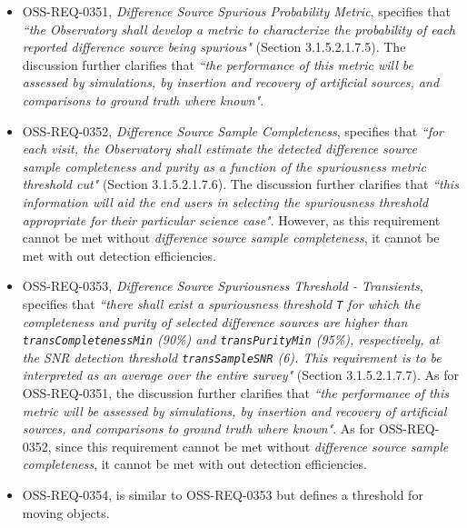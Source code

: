 \begin{itemize}

\item OSS-REQ-0351, {\it Difference Source Spurious Probability Metric}, specifies that {\it ``the Observatory shall develop a metric to characterize the probability of each reported difference source being spurious"} (Section 3.1.5.2.1.7.5).
The discussion further clarifies that {\it ``the performance of this metric will be assessed by simulations, by insertion and recovery of artificial sources, and comparisons to ground truth where known"}.

\item OSS-REQ-0352, {\it Difference Source Sample Completeness}, specifies that {\it ``for each visit, the Observatory shall estimate the detected difference source sample completeness and purity as a function of the spuriousness metric threshold cut"} (Section 3.1.5.2.1.7.6).
The discussion further clarifies that {\it ``this information will aid the end
users in selecting the spuriousness threshold appropriate for their particular science case"}.
However, as this requirement cannot be met without {\it difference source sample completeness}, it cannot be met with out detection efficiencies.

\item OSS-REQ-0353, {\it Difference Source Spuriousness Threshold - Transients}, specifies that {\it ``there shall exist a spuriousness threshold {\tt T} for which the completeness and purity of selected difference sources are higher than {\tt transCompletenessMin} (90\%) and {\tt transPurityMin} (95\%), respectively, at the SNR detection threshold {\tt transSampleSNR} (6). This requirement is to be interpreted as an average over the entire survey"} (Section 3.1.5.2.1.7.7).
As for OSS-REQ-0351, the discussion further clarifies that {\it ``the performance of this metric will be assessed by simulations, by insertion and recovery of artificial sources, and comparisons to ground truth where known"}.
As for OSS-REQ-0352, since this requirement cannot be met without {\it difference source sample completeness}, it cannot be met with out detection efficiencies.

\item OSS-REQ-0354, is similar to OSS-REQ-0353 but defines a threshold for moving objects.

\end{itemize}

